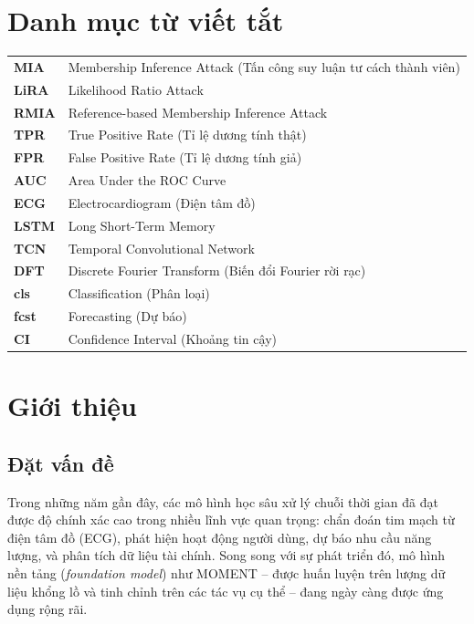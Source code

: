 \documentclass[12pt,a4paper]{report}
\begin{document}
\chapter*{Danh mục từ viết tắt}

\begin{tabular}{lp{10cm}}
\textbf{MIA}     & Membership Inference Attack (Tấn công suy luận tư cách thành viên) \\
\textbf{LiRA}    & Likelihood Ratio Attack \\
\textbf{RMIA}    & Reference-based Membership Inference Attack \\
\textbf{TPR}     & True Positive Rate (Tỉ lệ dương tính thật) \\
\textbf{FPR}     & False Positive Rate (Tỉ lệ dương tính giả) \\
\textbf{AUC}     & Area Under the ROC Curve \\
\textbf{ECG}     & Electrocardiogram (Điện tâm đồ) \\
\textbf{LSTM}    & Long Short-Term Memory \\
\textbf{TCN}     & Temporal Convolutional Network \\
\textbf{DFT}     & Discrete Fourier Transform (Biến đổi Fourier rời rạc) \\
\textbf{cls}     & Classification (Phân loại) \\
\textbf{fcst}    & Forecasting (Dự báo) \\
\textbf{CI}      & Confidence Interval (Khoảng tin cậy) \\
\end{tabular}

\chapter{Giới thiệu}

\section{Đặt vấn đề}

Trong những năm gần đây, các mô hình học sâu xử lý chuỗi thời gian đã đạt được độ chính xác cao trong nhiều lĩnh vực quan trọng: chẩn đoán tim mạch từ điện tâm đồ (ECG), phát hiện hoạt động người dùng, dự báo nhu cầu năng lượng, và phân tích dữ liệu tài chính. Song song với sự phát triển đó, mô hình nền tảng (\textit{foundation model}) như MOMENT \cite{goswami2024} -- được huấn luyện trên lượng dữ liệu khổng lồ và tinh chỉnh trên các tác vụ cụ thể -- đang ngày càng được ứng dụng rộng rãi.
\end{document}
